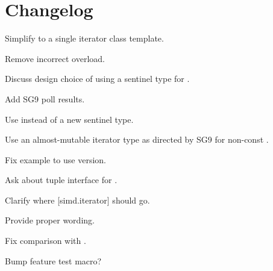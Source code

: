 \section{Changelog}
\begin{revision}
\item Simplify to a single iterator class template.
\item Remove incorrect  overload.
\item Discuss design choice of using a sentinel type for .
\end{revision}

\begin{revision}
\item Add SG9 poll results.
\item Use  instead of a new sentinel type.
\item Use an almost-mutable iterator type as directed by SG9 for
  non-const .
\item Fix  example to use  version.
\end{revision}

\begin{revision}
\item Ask about tuple interface for .
\item Clarify where [simd.iterator] should go.
\item Provide proper wording.
\item Fix \code{<=>} comparison with .
\item Bump feature test macro?
\end{revision}
